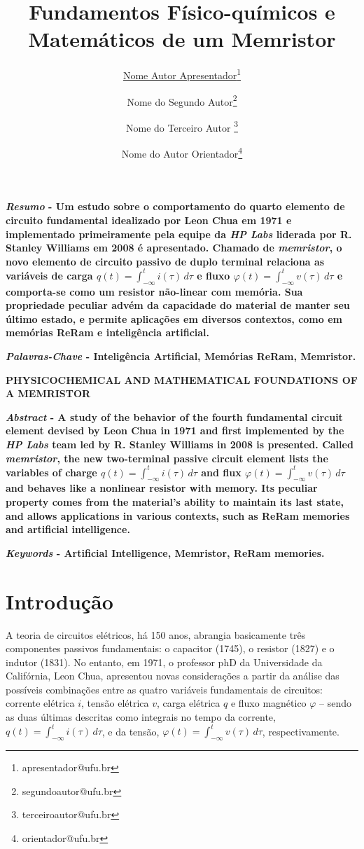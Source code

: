 \documentclass{ceel}
\title{Fundamentos Físico-químicos e Matemáticos de um Memristor}
\author[1]{\underline{Nome Autor Apresentador}\thanks{apresentador@ufu.br}}
\author[1]{Nome do Segundo Autor\thanks{segundoautor@ufu.br}}
\author[1]{Nome do Terceiro Autor \thanks{terceiroautor@ufu.br}}
\author[2]{Nome do Autor Orientador\thanks{orientador@ufu.br}}
\affil[1]{FEELT - Universidade Federal de Uberlândia}
\affil[2]{FEELT - Professor Adjunto - Universidade Federal de Uberlândia}
\begin{document}
\inserirtitulo

\begin{multicols}{2}

\textbf{\emph{Resumo} - Um estudo sobre o comportamento do quarto elemento de circuito fundamental idealizado por Leon Chua em 1971 e implementado primeiramente pela equipe da \emph{HP Labs} liderada por R. Stanley Williams em 2008 é apresentado. Chamado de \emph{memristor}, o novo elemento de circuito passivo de duplo terminal relaciona as variáveis de carga $q(t)=\int_{-\infty}^t i(\tau)\, d\tau$ e fluxo $\varphi(t)=\int_{-\infty}^t v(\tau)\, d\tau$ e comporta-se como um resistor não-linear com memória. Sua propriedade peculiar advém da capacidade do material de manter seu último estado, e permite aplicações em diversos contextos, como em memórias ReRam e inteligência artificial.} %
\vspace*{10pt}

\textbf{\emph{Palavras-Chave} - Inteligência Artificial, Memórias ReRam, Memristor.}


\begin{center}

\noindent\textbf{\large \uppercase{Physicochemical and Mathematical Foundations of a Memristor}}
\end{center}

\textbf{\emph{Abstract} - A study of the behavior of the fourth fundamental circuit element devised by Leon Chua in 1971 and first implemented by the \emph{HP Labs} team led by R. Stanley Williams in 2008 is presented. Called \emph {memristor}, the new two-terminal passive circuit element lists the variables of charge $q(t)=\int_{-\infty}^t i(\tau)\, d\tau$ and flux $\varphi(t)=\int_{-\infty}^t v(\tau)\, d\tau$ and behaves like a nonlinear resistor with memory. Its peculiar property comes from the material's ability to maintain its last state, and allows applications in various contexts, such as ReRam memories and artificial intelligence.}
\vspace*{10pt}

\textbf{\emph{Keywords} - Artificial Intelligence, Memristor, ReRam memories.}


\section{Introdução}
A teoria de circuitos elétricos, há 150 anos, abrangia basicamente três componentes passivos fundamentais: o capacitor (1745), o resistor (1827) e o indutor (1831). No entanto, em 1971, o professor phD da Universidade da Califórnia, Leon Chua, apresentou novas considerações a partir da análise das possíveis combinações entre as quatro variáveis fundamentais de circuitos: corrente elétrica $i$, tensão elétrica $v$, carga elétrica $q$ e fluxo magnético $\varphi$ – sendo as duas últimas descritas como integrais no tempo da corrente, $q(t)=\int_{-\infty}^t i(\tau)\, d\tau$, e da tensão, $\varphi(t)=\int_{-\infty}^t v(\tau)\, d\tau$, respectivamente.


\end{multicols}
\end{document}
